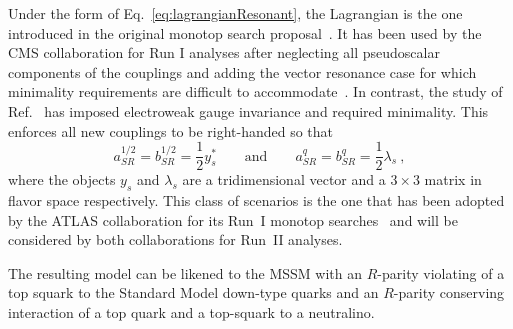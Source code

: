 Under the form of Eq.~\eqref{eq:lagrangianResonant}, the Lagrangian is the one
introduced in the original monotop search proposal~\cite{AndreaFuksMaltoni}. It has been
used by the CMS collaboration for Run I analyses after neglecting all pseudoscalar components
of the couplings and adding the vector resonance case for which minimality
requirements are difficult to accommodate~\cite{Khachatryan:2014uma}. In contrast, the
study of Ref.~\cite{Boucheneb:2014wza} has imposed electroweak gauge invariance and
required minimality. This enforces all new couplings to be right-handed so that
\begin{equation}
a^{1/2}_{SR} = b^{1/2}_{SR} = \frac12 y_s^*
\qquad\text{and}\qquad
a^q_{SR} = b^q_{SR} = \frac12 \lambda_s \ ,
\end{equation}
where the objects $y_s$ and $\lambda_s$ are
a tridimensional vector and a $3\times 3$ matrix
in flavor space respectively. 
This class of scenarios is the one that has been adopted by the ATLAS collaboration for its
Run~I monotop searches~\cite{ATLASmonotop} and will be considered by both
collaborations for Run~II analyses.


The resulting model can be likened to the MSSM with an $R$-parity violating of
a top squark to the Standard Model down-type quarks and an $R$-parity
conserving interaction of a top quark and a top-squark to a neutralino.
  

\label{sec:NonResonantProd}

